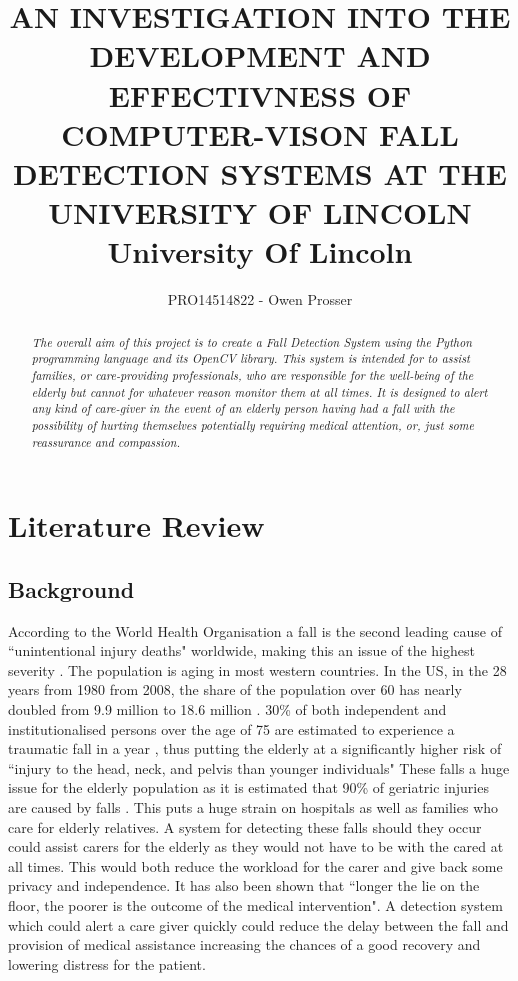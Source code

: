 \documentclass[11pt,a4paper]{report}
\title{
	{AN INVESTIGATION INTO THE DEVELOPMENT AND EFFECTIVNESS OF COMPUTER-VISON FALL DETECTION SYSTEMS AT THE UNIVERSITY OF LINCOLN}\\
	{\large University Of Lincoln}
}
\author{PRO14514822 - Owen Prosser}
\newcommand\blankpage{%
    \null
    \thispagestyle{empty}%
    \addtocounter{page}{-1}%
    \newpage}
\begin{document}
\maketitle

\begin{abstract}
\emph{The overall aim of this project is to create a Fall Detection System using the Python programming language and its OpenCV library. This system is intended for to assist families, or care-providing professionals, who are responsible for the well-being of the elderly but cannot for whatever reason monitor them at all times. It is designed to alert any kind of care-giver in the event of an elderly person having had a fall with the possibility of hurting themselves potentially requiring medical attention, or, just some reassurance and compassion.}
\end{abstract}


\tableofcontents
\pagebreak
\listoffigures


\chapter{Literature Review}
\section{Background}
According to the World Health Organisation a fall is the second leading cause of ``unintentional injury deaths" worldwide, making this an issue of the highest severity \citep{Cruz_Fall_detection_wearable_device}. The population is aging in most western countries. In the US, in the 28 years from 1980 from 2008, the share of the population over 60 has nearly doubled from 9.9 million to 18.6 million \citep{Siracuse_Health_care_and_socioeconomic}. 30\% of both independent and institutionalised persons over the age of 75 are estimated to experience a traumatic fall in a year \citep{Sixsmith_A_smart_sensor_to_detect}, thus putting the elderly at a significantly higher risk of ``injury to the head, neck, and pelvis than younger individuals"  These falls a huge issue for the elderly population as it is estimated that 90\% of geriatric injuries are caused by falls \citep{boltz_Injuries_and_outcomes}. This puts a huge strain on hospitals as well as families who care for elderly relatives. A system for detecting these falls should they occur could assist carers for the elderly as they would not have to be with the cared at all times. This would both reduce the workload for the carer and give back some privacy and independence. It has also been shown that ``longer the lie on the floor, the poorer is the outcome of the medical intervention"\citep{Li_A_microphone_array}. A detection system which could alert a care giver quickly could reduce the delay between the fall and provision of medical assistance increasing the chances of a good recovery and lowering distress for the patient.
\end{document}
